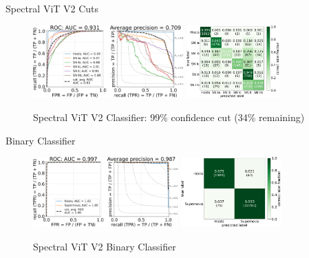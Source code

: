 \begin{frame}{Spectral ViT V2 Cuts}
    \begin{figure}[b!]
        \centering
        \includegraphics[height=2.8cm]{figures/Presentation/v2/vit_model_V2roc99_e26.png}
        \quad
        \includegraphics[height=2.8cm]{figures/Presentation/v2/vit_model_V2cm99_e26.png}
        \caption{Spectral ViT V2 Classifier: 99\% confidence cut (34\% remaining)\label{fig:v2_99_qual}}
    \end{figure}
\end{frame}


\begin{frame}{Binary Classifier}
    \begin{figure}[t!]
        \centering
        \includegraphics[height=2.7cm]{figures/Presentation/v2/vit_model_V2rocfull_binary_e26.png}
        \quad
        \includegraphics[height=2.7cm]{figures/Presentation/v2/vit_model_V2cmfull_binary_e26.png}
        \caption{Spectral ViT V2 Binary Classifier\label{fig:v2_binary_qual}}
    \end{figure}
\end{frame}

